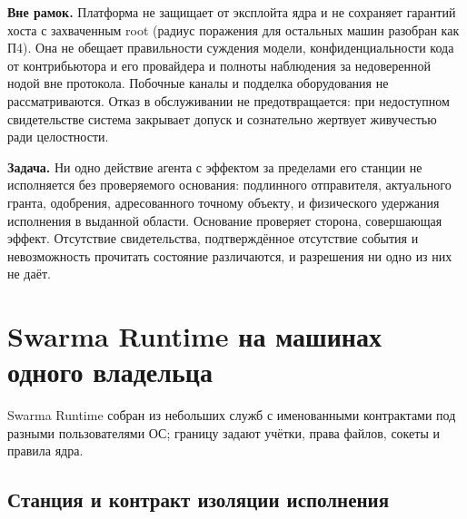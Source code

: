 \documentclass[10pt,a4paper]{article}
\begin{document}
\textbf{Вне рамок.} Платформа не защищает от эксплойта ядра и не сохраняет гарантий хоста с захваченным root (радиус поражения для остальных машин разобран как П4). Она не обещает правильности суждения модели, конфиденциальности кода от контрибьютора и его провайдера и полноты наблюдения за недоверенной нодой вне протокола. Побочные каналы и подделка оборудования не рассматриваются. Отказ в обслуживании не предотвращается: при недоступном свидетельстве система закрывает допуск и сознательно жертвует живучестью ради целостности.

\textbf{Задача.} Ни одно действие агента с эффектом за пределами его станции не исполняется без проверяемого основания: подлинного отправителя, актуального гранта, одобрения, адресованного точному объекту, и физического удержания исполнения в выданной области. Основание проверяет сторона, совершающая эффект. Отсутствие свидетельства, подтверждённое отсутствие события и невозможность прочитать состояние различаются, и разрешения ни одно из них не даёт.

\section{Swarma Runtime на машинах одного владельца}
\label{sec:runtime}

Swarma Runtime собран из небольших служб с именованными контрактами под разными пользователями ОС; границу задают учётки, права файлов, сокеты и правила ядра.

\subsection{Станция и контракт изоляции исполнения}
\label{sec:station}
\end{document}
